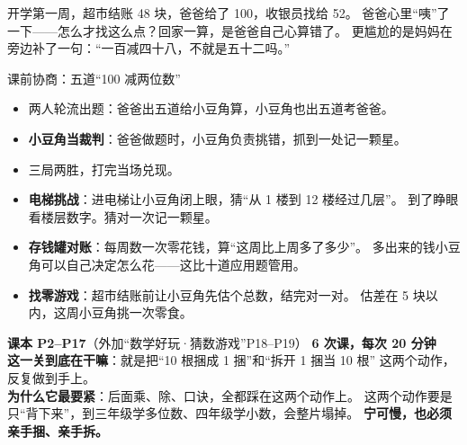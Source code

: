 
\begin{blunder}
开学第一周，超市结账 48 块，爸爸给了 100，收银员找给 52。
爸爸心里“咦”了一下——怎么才找这么点？回家一算，是爸爸自己心算错了。
更尴尬的是妈妈在旁边补了一句：“一百减四十八，不就是五十二吗。”
\end{blunder}

\begin{gamble}{课前协商：五道“100 减两位数”}
\begin{itemize}
  \item 两人轮流出题：爸爸出五道给小豆角算，小豆角也出五道考爸爸。
  \item \textbf{小豆角当裁判}：爸爸做题时，小豆角负责挑错，抓到一处记一颗星。\waterdrop
  \item 三局两胜，打完当场兑现。
\end{itemize}
\negolines
\end{gamble}

\begin{bonus}
\begin{itemize}
  \item \textbf{电梯挑战}：进电梯让小豆角闭上眼，猜“从 1 楼到 12 楼经过几层”。
        到了睁眼看楼层数字。猜对一次记一颗星。
  \item \textbf{存钱罐对账}：每周数一次零花钱，算“这周比上周多了多少”。
        多出来的钱小豆角可以自己决定怎么花——这比十道应用题管用。
  \item \textbf{找零游戏}：超市结账前让小豆角先估个总数，结完对一对。
        估差在 5 块以内，这周小豆角挑一次零食。
\end{itemize}
\end{bonus}

\begin{unitinfo}
\textbf{课本 P2--P17}（外加“数学好玩·猜数游戏”P18--P19）\quad
\textbf{6 次课，每次 20 分钟} \\[4pt]
\textbf{这一关到底在干嘛}：就是把“10 根捆成 1 捆”和“拆开 1 捆当 10 根”
这两个动作，反复做到手上。\\
\textbf{为什么它最要紧}：后面乘、除、口诀，全都踩在这两个动作上。
这两个动作要是只“背下来”，到三年级学多位数、四年级学小数，会整片塌掉。
\textbf{宁可慢，也必须亲手捆、亲手拆。}
\end{unitinfo}

